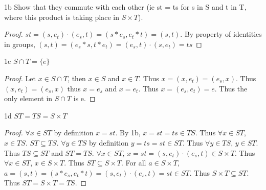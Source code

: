 \documentclass{article}
\begin{document}
\begin{claim}{1b}
    Show that they commute with each other (ie st = ts for s in S and t in T, where this product is taking place in $S \times T$).
\end{claim}
\begin{proof}
    $st = (s, e_t) \cdot (e_s, t) = (s * e_s,  e_t * t) = (s, t)$. By property of identities in groups, $(s, t) = (e_s * s, t * e_t) = (e_s, t) \cdot (s, e_t) = ts$
\end{proof}

\begin{claim}{1c}
    $S \cap T = \{e\}$
\end{claim}
\begin{proof}
    Let $x \in S \cap T$, then $x \in S$ and $x \in T$. Thus $x = (x, e_t) = (e_s, x)$. Thus $(x, e_t) = (e_s, x)$ thus $x = e_s$ and $x = e_t$. Thus $x = (e_s, e_t) = e$. Thus the only element in $S \cap T$ is e.
\end{proof}

\begin{claim}{1d}
    $ST = TS = S \times T$
\end{claim}
\begin{proof}
    $\forall x \in ST$ by definition $x = st$. By 1b, $x = st = ts \in TS$. Thus $\forall x \in ST$, $x \in TS$. $ST \subseteq TS$. $\forall y \in TS$ by definition $y = ts = st \in ST$. Thus $\forall y \in TS$, $y \in ST$. Thus $TS \subseteq ST$ and $ST = TS$. $\forall x \in ST$, $x = st = (s, e_t) \cdot (e_s, t) \in S \times T$. Thus $\forall x \in ST$, $x \in S\times T$. Thus $ST \subseteq S \times T$. For all $a \in S \times T$, $a = (s, t) = (s * e_s, e_t * t)= (s, e_t) \cdot (e_s, t) = st \in ST$. Thus $S \times T \subseteq ST$. Thus $ST = S \times T = TS$.
\end{proof}

\bigskip
\end{document}
